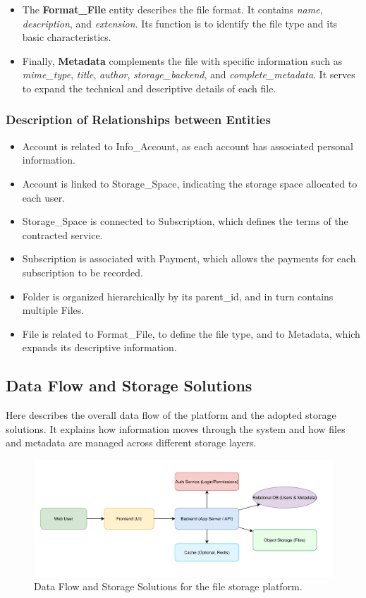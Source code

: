 \begin{itemize}
    \item The \textbf{Format\_File} entity describes the file format. It contains \textit{name}, \textit{description}, and \textit{extension}. Its function is to identify the file type and its basic characteristics.

    \item Finally, \textbf{Metadata} complements the file with specific information such as \textit{mime\_type}, \textit{title}, \textit{author}, \textit{storage\_backend}, and \textit{complete\_metadata}. It serves to expand the technical and descriptive details of each file.
\end{itemize}
\subsubsection{Description of Relationships between Entities}
\begin{itemize}
    \item Account is related to Info\_Account, as each account has associated personal information.
    \item Account is linked to Storage\_Space, indicating the storage space allocated to each user.
    \item Storage\_Space is connected to Subscription, which defines the terms of the contracted service.
    \item Subscription is associated with Payment, which allows the payments for each subscription to be recorded.
    \item Folder is organized hierarchically by its parent\_id, and in turn contains multiple Files.
    \item File is related to Format\_File, to define the file type, and to Metadata, which expands its descriptive information.
\end{itemize}
\subsection{Data Flow and Storage Solutions}

Here describes the overall data flow of the platform and the adopted storage solutions. It explains how information moves through the system and how files and metadata are managed across different storage layers.

\begin{figure}[H]
    \centering
    \includegraphics[width=0.95\linewidth,keepaspectratio]{initialdbarch/Dataflow.png}
    \caption{Data Flow and Storage Solutions for the file storage platform.}
    \label{fig:dataflow}
\end{figure}

